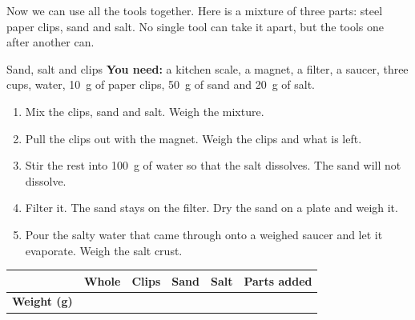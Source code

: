 \label{ch5}

Now we can use all the tools together. Here is a mixture of three parts: steel paper clips, sand and salt. No single tool can take it apart, but the tools one after another can.

\begin{center}
\end{center}

\begin{tryit}{Sand, salt and clips}
\textbf{You need:} a kitchen scale, a magnet, a filter, a saucer, three cups, water, 10~g of paper clips, 50~g of sand and 20~g of salt.
\begin{enumerate}[leftmargin=1.6em]
\item Mix the clips, sand and salt. Weigh the mixture.
\item Pull the clips out with the magnet. Weigh the clips and what is left.
\item Stir the rest into 100~g of water so that the salt dissolves. The sand will not dissolve.
\item Filter it. The sand stays on the filter. Dry the sand on a plate and weigh it.
\item Pour the salty water that came through onto a weighed saucer and let it evaporate. Weigh the salt crust.
\end{enumerate}
\par\medskip
\renewcommand{\arraystretch}{1.6}
\begin{tabular}{|l|c|c|c|c|c|}
\hline
 & \textbf{Whole} & \textbf{Clips} & \textbf{Sand} & \textbf{Salt} & \textbf{Parts added}\\ \hline
\textbf{Weight (g)} & & & & & \\ \hline
\end{tabular}
\end{tryit}

